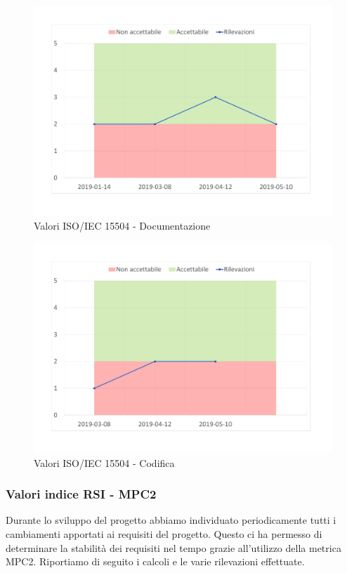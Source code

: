 \begin{figure}[H]
	\centering
	\includegraphics[scale=1]{images/resoconto/Documentazione.pdf}
	\caption{Valori ISO/IEC 15504 - Documentazione}	
\end{figure}


\begin{figure}[H]
	\centering
	\includegraphics[scale=1]{images/resoconto/Codifica.pdf}
	\caption{Valori ISO/IEC 15504 - Codifica}	
\end{figure}
\newpage
\subsubsection{Valori indice RSI - MPC2\\}
Durante lo sviluppo del progetto abbiamo individuato periodicamente tutti i cambiamenti apportati ai requisiti del progetto. Questo ci ha permesso di determinare la stabilità dei requisiti nel tempo grazie all'utilizzo della metrica MPC2.
Riportiamo di seguito i calcoli e le varie rilevazioni effettuate.

